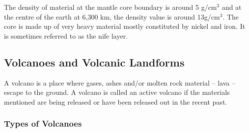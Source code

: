 \documentclass[8pt, a4paper, oneside, twocolumn]{extarticle}
\begin{document}
The density of material at the mantle core boundary is around 5 g/cm$^3$ and at the centre of the earth at 6,300 km, the density value is around 13g/cm$^3$. The core is made up of very heavy material mostly constituted by nickel and iron. It is sometimes referred to as the nife layer.

\subsection{Volcanoes and Volcanic Landforms}
A volcano is a place where gases, ashes and/or molten rock material – lava – escape to the ground. A volcano is called an active volcano if the materials mentioned are being released or have been released out in the recent past.

\subsubsection{Types of Volcanoes}
\end{document}
